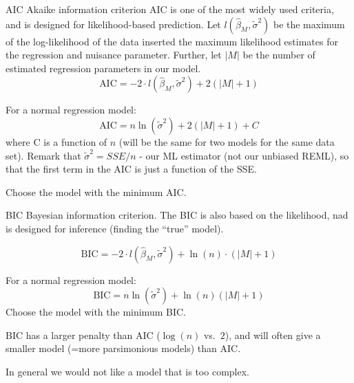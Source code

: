 \documentclass[
  ignorenonframetext,
]{beamer}
\begin{document}
\begin{frame}
\begin{block}{AIC Akaike information criterion}
\label{aic-akaike-information-criterion}
AIC is one of the most widely used criteria, and is designed for
likelihood-based prediction. Let \(l(\hat{\beta}_M,\tilde{\sigma}^2)\)
be the maximum of the log-likelihood of the data inserted the maximum
likelihood estimates for the regression and nuisance parameter. Further,
let \(\lvert M \rvert\) be the number of estimated regression parameters
in our model.
\[\text{AIC} =-2 \cdot l(\hat{\beta}_M,\tilde{\sigma}^2)+2(\lvert M\rvert +1)\]

For a normal regression model:
\[\text{AIC} =n\ln(\tilde{\sigma}^2)+2(\lvert M\rvert +1)+C\] where C is
a function of \(n\) (will be the same for two models for the same data
set). Remark that \(\tilde{\sigma}^2=SSE/n\) - our ML estimator (not our
unbiased REML), so that the first term in the AIC is just a function of
the SSE.

Choose the model with the minimum AIC.
\end{block}
\end{frame}

\begin{frame}
\begin{block}{BIC Bayesian information criterion.}
\label{bic-bayesian-information-criterion.}
The BIC is also based on the likelihood, nad is designed for inference
(finding the ``true'' model).

\[\text{BIC} =-2 \cdot l(\hat{\beta}_M,\tilde{\sigma}^2)+\ln(n)\cdot (\lvert M\rvert +1)\]

For a normal regression model:
\[ \text{BIC}= n\ln(\tilde{\sigma}^2)+\ln(n)(\lvert M\rvert +1)\] Choose
the model with the minimum BIC.

BIC has a larger penalty than AIC (\(\log(n)\) vs.~\(2\)), and will
often give a smaller model (=more parsimonious models) than AIC.

In general we would not like a model that is too complex.
\end{block}
\end{frame}
\end{document}
